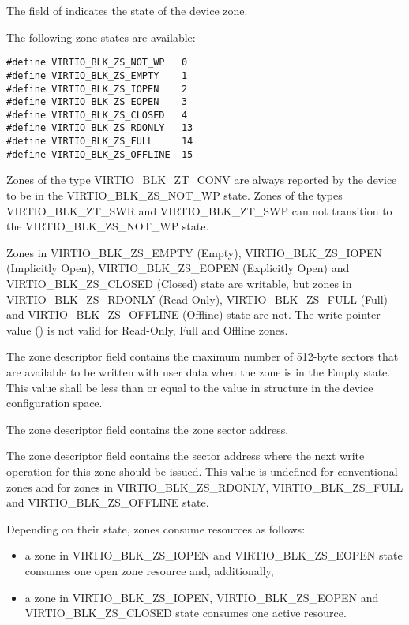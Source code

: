 The field  of  indicates the
state of the device zone.

The following zone states are available:

\begin{lstlisting}
#define VIRTIO_BLK_ZS_NOT_WP   0
#define VIRTIO_BLK_ZS_EMPTY    1
#define VIRTIO_BLK_ZS_IOPEN    2
#define VIRTIO_BLK_ZS_EOPEN    3
#define VIRTIO_BLK_ZS_CLOSED   4
#define VIRTIO_BLK_ZS_RDONLY   13
#define VIRTIO_BLK_ZS_FULL     14
#define VIRTIO_BLK_ZS_OFFLINE  15
\end{lstlisting}

Zones of the type VIRTIO_BLK_ZT_CONV are always reported by the device to be in
the VIRTIO_BLK_ZS_NOT_WP state. Zones of the types VIRTIO_BLK_ZT_SWR and
VIRTIO_BLK_ZT_SWP can not transition to the VIRTIO_BLK_ZS_NOT_WP state.

Zones in VIRTIO_BLK_ZS_EMPTY (Empty), VIRTIO_BLK_ZS_IOPEN (Implicitly Open),
VIRTIO_BLK_ZS_EOPEN (Explicitly Open) and VIRTIO_BLK_ZS_CLOSED (Closed) state
are writable, but zones in VIRTIO_BLK_ZS_RDONLY (Read-Only), VIRTIO_BLK_ZS_FULL
(Full) and VIRTIO_BLK_ZS_OFFLINE (Offline) state are not. The write pointer
value () is not valid for Read-Only, Full and Offline zones.

The zone descriptor field  contains the maximum number of 512-byte
sectors that are available to be written with user data when the zone is in the
Empty state. This value shall be less than or equal to the 
value in  structure in the device
configuration space.

The zone descriptor field  contains the zone sector address.

The zone descriptor field  contains the sector address where the
next write operation for this zone should be issued. This value is undefined
for conventional zones and for zones in VIRTIO_BLK_ZS_RDONLY,
VIRTIO_BLK_ZS_FULL and VIRTIO_BLK_ZS_OFFLINE state.

Depending on their state, zones consume resources as follows:
\begin{itemize}
\item a zone in VIRTIO_BLK_ZS_IOPEN and VIRTIO_BLK_ZS_EOPEN state consumes one
    open zone resource and, additionally,

\item a zone in VIRTIO_BLK_ZS_IOPEN, VIRTIO_BLK_ZS_EOPEN and
    VIRTIO_BLK_ZS_CLOSED state consumes one active resource.
\end{itemize}

